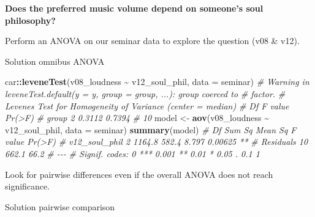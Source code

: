 \documentclass[
]{book}
\newenvironment{Shaded}{\begin{snugshade}}{\end{snugshade}}
\newcommand{\AttributeTok}[1]{\textcolor[rgb]{0.13,0.29,0.53}{#1}}
\newcommand{\CommentTok}[1]{\textcolor[rgb]{0.56,0.35,0.01}{\textit{#1}}}
\newcommand{\FunctionTok}[1]{\textcolor[rgb]{0.13,0.29,0.53}{\textbf{#1}}}
\newcommand{\NormalTok}[1]{#1}
\newcommand{\OtherTok}[1]{\textcolor[rgb]{0.56,0.35,0.01}{#1}}
\newcommand{\SpecialCharTok}[1]{\textcolor[rgb]{0.81,0.36,0.00}{\textbf{#1}}}
\begin{document}
\textbf{Does the preferred music volume depend on someone's soul philosophy?}

Perform an ANOVA on our seminar data to explore the question (v08 \& v12).

Solution omnibus ANOVA

\begin{Shaded}
\begin{Highlighting}[]
\NormalTok{car}\SpecialCharTok{::}\FunctionTok{leveneTest}\NormalTok{(v08\_loudness }\SpecialCharTok{\textasciitilde{}}\NormalTok{ v12\_soul\_phil, }\AttributeTok{data =}\NormalTok{ seminar)}
\CommentTok{\# Warning in leveneTest.default(y = y, group = group, ...): group coerced to}
\CommentTok{\# factor.}
\CommentTok{\# Levene\textquotesingle{}s Test for Homogeneity of Variance (center = median)}
\CommentTok{\#       Df F value Pr(\textgreater{}F)}
\CommentTok{\# group  2  0.3112 0.7394}
\CommentTok{\#       10}
\NormalTok{model }\OtherTok{\textless{}{-}} \FunctionTok{aov}\NormalTok{(v08\_loudness }\SpecialCharTok{\textasciitilde{}}\NormalTok{ v12\_soul\_phil, }\AttributeTok{data =}\NormalTok{ seminar)}
\FunctionTok{summary}\NormalTok{(model)}
\CommentTok{\#               Df Sum Sq Mean Sq F value  Pr(\textgreater{}F)   }
\CommentTok{\# v12\_soul\_phil  2 1164.8   582.4   8.797 0.00625 **}
\CommentTok{\# Residuals     10  662.1    66.2                   }
\CommentTok{\# {-}{-}{-}}
\CommentTok{\# Signif. codes:  0 \textquotesingle{}***\textquotesingle{} 0.001 \textquotesingle{}**\textquotesingle{} 0.01 \textquotesingle{}*\textquotesingle{} 0.05 \textquotesingle{}.\textquotesingle{} 0.1 \textquotesingle{} \textquotesingle{} 1}
\end{Highlighting}
\end{Shaded}

Look for pairwise differences even if the overall ANOVA does not reach significance.

Solution pairwise comparison

\begin{Shaded}
\end{Shaded}
\end{document}
